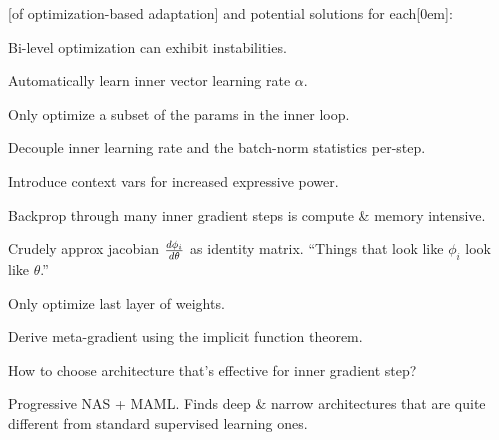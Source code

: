 \documentclass[11pt]{article}
\begin{document}
 [of optimization-based adaptation] and potential solutions for each[0em]:
\begin{compactitem}
	\item Bi-level optimization can exhibit instabilities.
	\begin{compactitem}
		\item Automatically learn inner vector learning rate $\alpha$. 
		\item Only optimize a subset of the params in the inner loop.
		\item Decouple inner learning rate and the batch-norm statistics per-step. 
		\item Introduce context vars for increased expressive power.
	\end{compactitem}

	\item Backprop through many inner gradient steps is compute \& memory intensive.
	\begin{compactitem}
		\item Crudely approx jacobian $\frac{d\phi_i}{d\theta}$ as identity matrix. ``Things that look like $\phi_i$ look like $\theta$.''
		\item Only optimize last layer of weights.
		\item Derive meta-gradient using the implicit function theorem.
	\end{compactitem}
	
	\item How to choose architecture that's effective for inner gradient step?
	\begin{compactitem}
		\item Progressive NAS + MAML. Finds deep \& narrow architectures that are quite different from standard supervised learning ones.
	\end{compactitem}
\end{compactitem}








\end{document}
